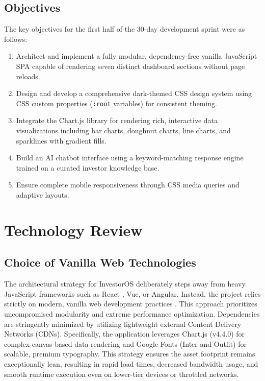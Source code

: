 \documentclass{book}
\begin{document}
\section{Objectives}
The key objectives for the first half of the 30-day development sprint were as follows:
\begin{enumerate}
    \item Architect and implement a fully modular, dependency-free vanilla JavaScript SPA capable of rendering seven distinct dashboard sections without page reloads.
    \item Design and develop a comprehensive dark-themed CSS design system using CSS custom properties (\texttt{:root} variables) for consistent theming.
    \item Integrate the Chart.js library \cite{chartjs2024} for rendering rich, interactive data visualizations including bar charts, doughnut charts, line charts, and sparklines with gradient fills.
    \item Build an AI chatbot interface using a keyword-matching response engine trained on a curated investor knowledge base.
    \item Ensure complete mobile responsiveness through CSS media queries and adaptive layouts.
\end{enumerate}

\chapter{Technology Review}
\section{Choice of Vanilla Web Technologies}
The architectural strategy for InvestorOS deliberately steps away from heavy JavaScript frameworks such as React \cite{react2024}, Vue, or Angular. Instead, the project relies strictly on modern, vanilla web development practices \cite{mdn2024js}. This approach prioritizes uncompromised modularity and extreme performance optimization. Dependencies are stringently minimized by utilizing lightweight external Content Delivery Networks (CDNs). Specifically, the application leverages Chart.js (v4.4.0) \cite{chartjs2024} for complex canvas-based data rendering and Google Fonts \cite{googlefonts2024} (Inter and Outfit) for scalable, premium typography. This strategy ensures the asset footprint remains exceptionally lean, resulting in rapid load times, decreased bandwidth usage, and smooth runtime execution even on lower-tier devices or throttled networks.
\end{document}

